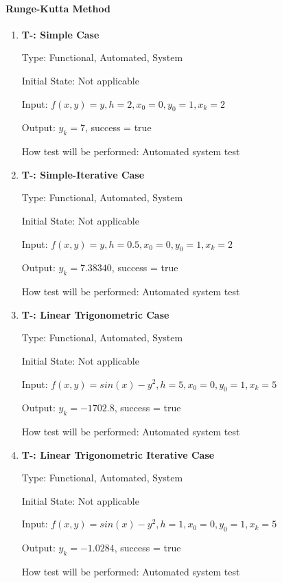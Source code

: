 \documentclass[12pt, titlepage]{article}
\newcounter{tnum} %
\begin{document}
\paragraph{Runge-Kutta Method}
\begin{enumerate}

\item{\textbf{T-\thetnum \label{t-rk_simple}: Simple Case}}

Type: Functional, Automated, System %
					
Initial State: Not applicable
					
Input: $f(x, y) = y, h = 2, x_0 = 0, y_0 = 1, x_k = 2$
					
Output: $y_k = 7$, success = true
					
How test will be performed: Automated system test

\item{\textbf{T-\thetnum \label{t-rk_simpleiterative}: Simple-Iterative Case}}

Type: Functional, Automated, System %
					
Initial State: Not applicable
					
Input: $f(x, y) = y, h = 0.5, x_0 = 0, y_0 = 1, x_k = 2$
					
Output: $y_k = 7.38340$, success = true
					
How test will be performed: Automated system test

\item{\textbf{T-\thetnum \label{t-rk_nonlinear}: Linear Trigonometric Case}}

Type: Functional, Automated, System %
					
Initial State: Not applicable
					
Input: $f(x, y) = sin(x) - y^2, h = 5, x_0 = 0, y_0 = 1, x_k = 5$
					
Output: $y_k = -1702.8$, success = true
					
How test will be performed: Automated system test

\item{\textbf{T-\thetnum \label{t-rk_nonlineariterative}: Linear Trigonometric Iterative Case}}

Type: Functional, Automated, System %
					
Initial State: Not applicable
					
Input: $f(x, y) = sin(x) - y^2, h = 1, x_0 = 0, y_0 = 1, x_k = 5$
					
Output: $y_k = -1.0284$, success = true
					
How test will be performed: Automated system test

\end{enumerate}
\end{document}
